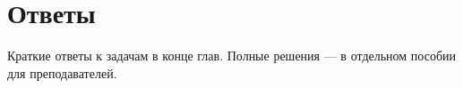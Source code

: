 \chapter{Ответы}
\label{sec:answers}

Краткие ответы к задачам в конце глав. Полные решения --- в отдельном пособии для преподавателей.
























